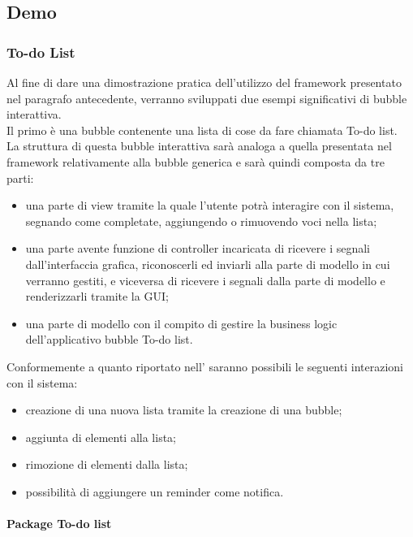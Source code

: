 \subsection{Demo}

\subsubsection{To-do List} \label{todo-list}
Al fine di dare una dimostrazione pratica dell'utilizzo del framework presentato nel paragrafo antecedente, verranno sviluppati due esempi significativi di bubble interattiva.\\
Il primo è una bubble contenente una lista di cose da fare chiamata To-do list.\\
La struttura di questa bubble interattiva sarà analoga a quella presentata nel framework relativamente alla bubble generica e sarà quindi composta da tre parti:
\begin{itemize}
	\item una parte di view tramite la quale l'utente potrà interagire con il sistema, segnando come completate, aggiungendo o rimuovendo voci nella lista;
	\item una parte avente funzione di controller incaricata di ricevere i segnali dall'interfaccia grafica, riconoscerli ed inviarli alla parte di modello in cui verranno gestiti, e viceversa di ricevere i segnali dalla parte di modello e renderizzarli tramite la GUI;
	\item una parte di modello con il compito di gestire la business logic dell'applicativo bubble To-do list.
\end{itemize}
Conformemente a quanto riportato nell'\AnalisiDeiRequisiti{} saranno possibili le seguenti interazioni con il sistema:
\begin{itemize}
	\item creazione di una nuova lista tramite la creazione di una bubble;
	\item aggiunta di elementi alla lista;
	\item rimozione di elementi dalla lista;
	\item possibilità di aggiungere un reminder come notifica.
\end{itemize}

\paragraph{Package To-do list}\mbox{}\\


